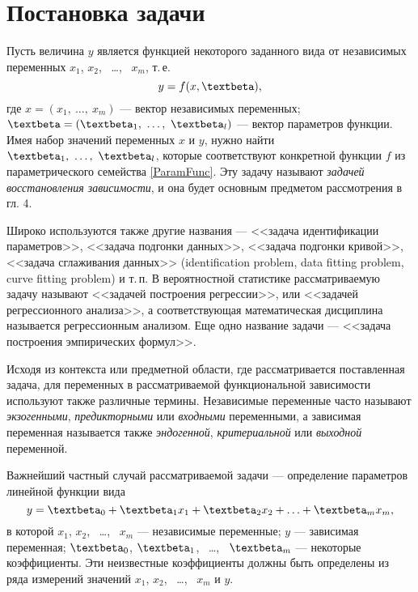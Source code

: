 \documentclass[a5paper,openany]{book}
\renewcommand{\beta}{\text{\textbeta}}
\begin{document}

\section{Постановка задачи} \label{FuncProblemDescr}


Пусть величина $y$ является функцией некоторого заданного вида от 
независимых переменных $x_1$, $x_2$, \ \ldots, \ $x_m$, т.\,е. 
\begin{equation}
	\label{ParamFunc} 
	y = f(x, \beta), 
\end{equation}
где $x = (x_{1},  \ \ldots, \ x_{m})$ --- вектор независимых переменных; $\beta = (\beta_1, \ \ldots, \ \beta_l)$ --- вектор параметров функции. 
Имея набор значений переменных $x$  и $y$, нужно найти $\beta_1, \ \ldots, \ \beta_l$, которые соответствуют конкретной 
функции $f$ из параметрического семейства \eqref{ParamFunc}. Эту задачу 
называют \emph{задачей восстановления зависимости}, и она будет основным предметом 
рассмотрения в гл. 4.                 

Широко используются также другие названия --- <<задача идентификации параметров>>,  
<<задача подгонки данных>>, <<задача подгонки кривой>>,
<<задача сглаживания данных>> (identification problem, data fitting  problem, curve fitting problem) и т.\,п. 
В вероятностной статистике рассматриваемую  задачу называют <<задачей построения регрессии>>, или 
<<задачей регрессионного анализа>>, а соответствующая математическая дисциплина 
называется регрессионным анализом.           
Еще одно название задачи --- <<задача построения эмпирических формул>>. 

Исходя из контекста или предметной области, где рассматривается поставленная задача, 
для переменных в рассматриваемой функциональной зависимости используют также 
различные термины. Независимые переменные часто называют \emph{экзогенными}, 
\emph{предикторными} или \emph{входными} переменными, а зависимая переменная 
называется также \emph{эндогенной}, \emph{критериальной} или \emph{выходной} переменной. 

Важнейший частный случай рассматриваемой задачи --- определение параметров линейной 
функции вида 
\begin{equation} 
	\label{LinFunc}
	y = \beta_0 + \beta_1 x_1 + \beta_2 x_2 + \ldots + \beta_m x_m , 
\end{equation} 
в которой $x_1$, $x_2$, \ \ldots, \ $x_m$ --- независимые переменные; $y$ --- зависимая 
переменная; $\beta_0$, $\beta_1$, \ \ldots, \ $\beta_m$ --- некоторые коэффициенты. 
Эти неизвестные коэффициенты должны быть определены из ряда измерений значений $x_1$, 
$x_2$, \ \ldots, \ $x_m$ и $y$. 
\end{document}
